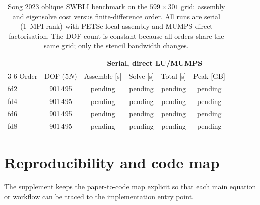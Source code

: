 \documentclass[11pt]{article}
\begin{document}
\begin{table}[t]
\centering
\small
\begin{tabular}{lccccc}
\toprule
 & & \multicolumn{4}{c}{Serial, direct LU/MUMPS} \\
\cmidrule(lr){3-6}
Order & DOF ($5N$) & Assemble [s] & Solve [s] & Total [s] & Peak [GB] \\
\midrule
fd2 & 901\,495 & pending & pending & pending & pending \\
fd4 & 901\,495 & pending & pending & pending & pending \\
fd6 & 901\,495 & pending & pending & pending & pending \\
fd8 & 901\,495 & pending & pending & pending & pending \\
\bottomrule
\end{tabular}
\caption{Song 2023 oblique SWBLI benchmark on the $599\times301$ grid:
assembly and eigensolve cost versus finite-difference order. All runs are
serial (1~MPI rank) with PETSc local assembly and MUMPS direct
factorisation. The DOF count is constant because all orders share the same
grid; only the stencil bandwidth changes.}
\label{tab:scaling}
\end{table}

\section{Reproducibility and code map}
\label{sec:repro_checklist}

The supplement keeps the paper-to-code map explicit so that each main equation
or workflow can be traced to the implementation entry point.
\end{document}
